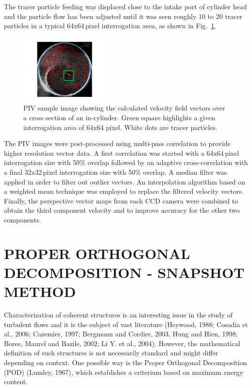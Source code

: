 \documentclass[12pt,a4paper]{article}
\begin{document}
The tracer particle feeding was displaced close to the intake port of cylinder head and the particle flow has been adjusted until it was seen roughly 10 to 20 tracer particles in a typical 64x64\,pixel interrogation area, as shown in Fig.~\ref{fig: densityimage}. 

\begin{figure}[h]
 \centering
 \includegraphics[width=0.4\textwidth]{./imgs/density.pdf}
 \caption{PIV sample image showing the calculated velocity field vectors over a cross section of an in-cylinder. Green square highlights a given interrogation area of 64x64 pixel. White dots are tracer particles.}
 \label{fig: densityimage}
\end{figure}

The PIV images were post-processed using multi-pass correlation to provide higher resolution vector data. A first correlation was started with a 64x64\,pixel interrogation size with 50$\%$ overlap followed by an adaptive cross-correlation with a final 32x32\,pixel interrogation size with 50$\%$ overlap. A median filter was applied in order to filter out outlier vectors. An interpolation algorithm based on a weighted mean technique was employed to replace the filtered velocity vectors. Finally, the perspective vector maps from each CCD camera were combined to obtain the third component velocity and to improve accuracy for the other two components.


\section{PROPER ORTHOGONAL DECOMPOSITION - SNAPSHOT METHOD}

Characterization of coherent structures is an interesting issue in the study of turbulent flows and it is the subject of vast literature (Heywood, 1988; Cosadia et al., 2006; Cazemier, 1997; Bergmann and Cordier, 2003, Hung and Hien, 1998; Boree, Maurel and Bazile, 2002; Li Y. et al., 2004). However, the mathematical definition of such structures is not necessarily standard and might differ depending on context. One possible way is the Proper Orthogonal Decomposition (POD) (Lumley, 1967), which establishes a criterium based on maximum energy content.
\end{document}
